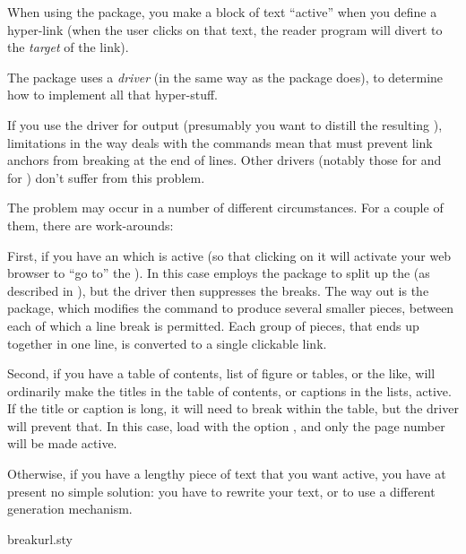 
When using the  package, you make a block of text
``active'' when you define a hyper-link (when the user clicks on
that text, the reader program will divert to the \emph{target} of the
link).

The  package uses a \emph{driver} (in the same way
as the  package does), to determine how to implement
all that hyper-stuff.

If you use the driver for  output (presumably you want
to distill the resulting \PS{}), limitations in the way 
deals with the  commands mean that 
must prevent link anchors from breaking at the end of lines.  Other
drivers (notably those for \PDFTeX{} and for ) don't
suffer from this problem.

The problem may occur in a number of different circumstances.  For a
couple of them, there are work-arounds:

First, if you have an  which is active (so that clicking on
it will activate your web browser to ``go to'' the ).  In
this case  employs the  package to
split up the  (as described in %
), but the
 driver then suppresses the breaks.  The way out is
the  package, which modifies the  command
to produce several smaller pieces, between each of which a line break
is permitted.  Each group of pieces, that ends up together in one
line, is converted to a single clickable link.

Second, if you have a table of contents, list of figure or tables, or
the like,  will ordinarily make the titles in the
table of contents, or captions in the lists, active.  If the title or
caption is long, it will need to break within the table, but the
 driver will prevent that.  In this case, load
 with the option , and only
the page number will be made active.

Otherwise, if you have a lengthy piece of text that you want active,
you have at present no simple solution: you have to rewrite your text,
or to use a different  generation mechanism.
\begin{ctanrefs}
\item[breakurl.sty]
\end{ctanrefs}

